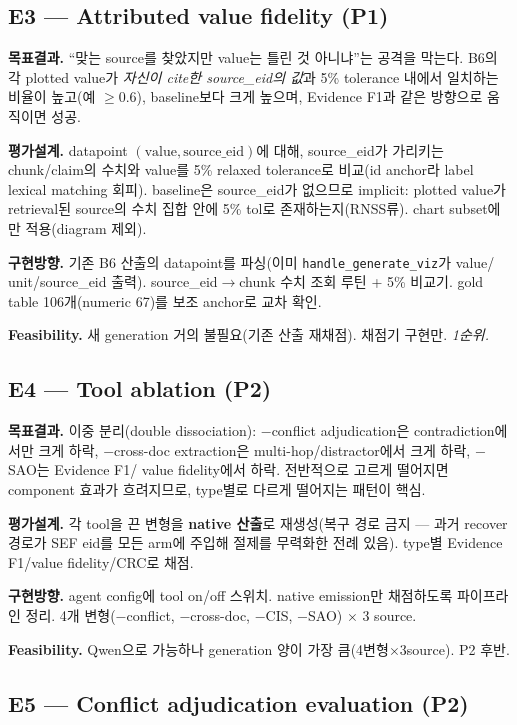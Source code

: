 \documentclass[11pt]{article}
\begin{document}
\subsection{E3 — Attributed value fidelity (P1)}

\textbf{목표결과.} ``맞는 source를 찾았지만 value는 틀린 것 아니냐''는 공격을 막는다. B6의 각
plotted value가 \emph{자신이 cite한 source\_eid의 값}과 5\% tolerance 내에서 일치하는 비율이
높고(예 $\geq$0.6), baseline보다 크게 높으며, Evidence F1과 같은 방향으로 움직이면 성공.

\textbf{평가설계.} datapoint $(\text{value}, \text{source\_eid})$에 대해, source\_eid가 가리키는
chunk/claim의 수치와 value를 5\% relaxed tolerance로 비교(id anchor라 label lexical matching
회피). baseline은 source\_eid가 없으므로 implicit: plotted value가 retrieval된 source의 수치
집합 안에 5\% tol로 존재하는지(RNSS류). chart subset에만 적용(diagram 제외).

\textbf{구현방향.} 기존 B6 산출의 datapoint를 파싱(이미 \texttt{handle\_generate\_viz}가 value/
unit/source\_eid 출력). source\_eid$\rightarrow$chunk 수치 조회 루틴 + 5\% 비교기. gold table
106개(numeric 67)를 보조 anchor로 교차 확인.

\textbf{Feasibility.} 새 generation 거의 불필요(기존 산출 재채점). 채점기 구현만. \emph{1순위.}

\subsection{E4 — Tool ablation (P2)}

\textbf{목표결과.} 이중 분리(double dissociation): $-$conflict adjudication은 contradiction에서만
크게 하락, $-$cross-doc extraction은 multi-hop/distractor에서 크게 하락, $-$SAO는 Evidence F1/
value fidelity에서 하락. 전반적으로 고르게 떨어지면 component 효과가 흐려지므로, type별로 다르게
떨어지는 패턴이 핵심.

\textbf{평가설계.} 각 tool을 끈 변형을 \textbf{native 산출}로 재생성(복구 경로 금지 — 과거
recover 경로가 SEF eid를 모든 arm에 주입해 절제를 무력화한 전례 있음). type별 Evidence F1/value
fidelity/CRC로 채점.

\textbf{구현방향.} agent config에 tool on/off 스위치. native emission만 채점하도록 파이프라인
정리. 4개 변형($-$conflict, $-$cross-doc, $-$CIS, $-$SAO) $\times$ 3 source.

\textbf{Feasibility.} Qwen으로 가능하나 generation 양이 가장 큼(4변형$\times$3source). P2 후반.

\subsection{E5 — Conflict adjudication evaluation (P2)}
\end{document}
